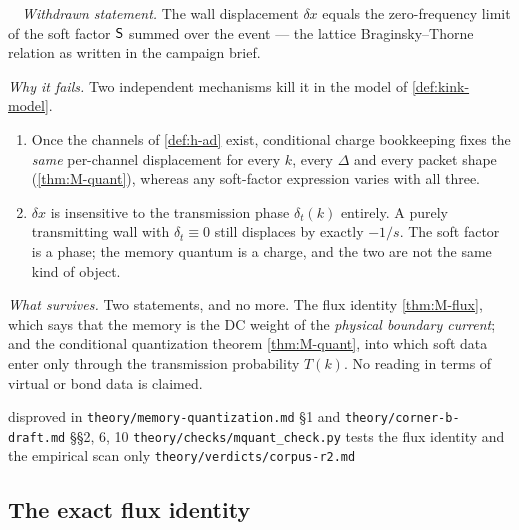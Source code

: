 \begin{refutedclaim}
\label{ref:soft-factor-memory}
\statusRefuted\ \ \emph{Withdrawn statement.} The wall displacement $\delta x$
equals the zero-frequency limit of the soft factor $\mathsf{S}$ summed over the
event --- the lattice Braginsky--Thorne relation as written in the campaign
brief.

\smallskip
\emph{Why it fails.} Two independent mechanisms kill it in the model of
\cref{def:kink-model}.
\begin{enumerate}
\item Once the channels of \cref{def:h-ad} exist, conditional charge
  bookkeeping fixes the \emph{same} per-channel displacement for every $k$,
  every $\Delta$ and every packet shape (\cref{thm:M-quant}), whereas any
  soft-factor expression varies with all three.
\item $\delta x$ is insensitive to the transmission phase $\delta_t(k)$
  entirely. A purely transmitting wall with $\delta_t\equiv0$ still displaces by
  exactly $-1/s$. The soft factor is a phase; the memory quantum is a charge,
  and the two are not the same kind of object.
\end{enumerate}

\smallskip
\emph{What survives.} Two statements, and no more. The flux identity
\cref{thm:M-flux}, which says that the memory is the DC weight of the
\emph{physical boundary current}; and the conditional quantization theorem
\cref{thm:M-quant}, into which soft data enter only through the transmission
probability $T(k)$. No reading in terms of virtual or bond data is claimed.
\end{refutedclaim}

%
{disproved in \texttt{theory/memory-quantization.md} \S1 and
 \texttt{theory/corner-b-draft.md} \S\S2, 6, 10}%
{\texttt{theory/checks/mquant\_check.py} tests the flux identity and the
 empirical scan only}%
{\texttt{theory/verdicts/corpus-r2.md}}

\subsection{The exact flux identity}

